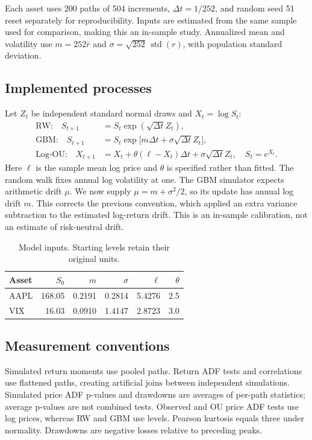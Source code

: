\documentclass[11pt,a4paper]{article}
\begin{document}
Each asset uses 200 paths of 504 increments, $\Delta t=1/252$, and random
seed 51 reset separately for reproducibility. Inputs are estimated from
the same sample used for comparison, making this an in-sample study.
Annualized mean and volatility use $m=252\bar r$ and
$\sigma=\sqrt{252}\,\operatorname{std}(r)$, with population standard deviation.

\subsection{Implemented processes}
Let $Z_t$ be independent standard normal draws and $X_t=\log S_t$:
\begin{align*}
\text{RW:}\quad S_{t+1}&=S_t\exp(\sqrt{\Delta t}Z_t),\\
\text{GBM:}\quad S_{t+1}&=S_t\exp\bigl[m\Delta t+\sigma\sqrt{\Delta t}Z_t\bigr],\\
\text{Log-OU:}\quad X_{t+1}&=X_t+\theta(\ell-X_t)\Delta t+\sigma\sqrt{\Delta t}Z_t,
\quad S_t=e^{X_t}.
\end{align*}
Here $\ell$ is the sample mean log price and $\theta$ is specified rather
than fitted. The random walk fixes annual log volatility at one.
The GBM simulator expects arithmetic drift $\mu$. We now supply
$\mu=m+\sigma^2/2$, so its update has annual log drift $m$. This corrects
the previous convention, which applied an extra variance subtraction
to the estimated log-return drift. This is an in-sample calibration, not
an estimate of risk-neutral drift.

\begin{table}[htbp]\centering
\caption{Model inputs. Starting levels retain their original units.}
\begin{tabular}{lrrrrr}\toprule
Asset & $S_0$ & $m$ & $\sigma$ & $\ell$ & $\theta$ \\\midrule
AAPL & 168.05 & 0.2191 & 0.2814 & 5.4276 & 2.5 \\
VIX & 16.03 & 0.0910 & 1.4147 & 2.8723 & 3.0 \\
\bottomrule\end{tabular}\end{table}

\subsection{Measurement conventions}
Simulated return moments use pooled paths. Return ADF tests and
correlations use flattened paths, creating artificial joins between
independent simulations. Simulated price ADF p-values and drawdowns are
averages of per-path statistics; average p-values are not combined tests.
Observed and OU price ADF tests use log prices, whereas RW and GBM use
levels. Pearson kurtosis equals three under normality. Drawdowns are
negative losses relative to preceding peaks.
\end{document}
